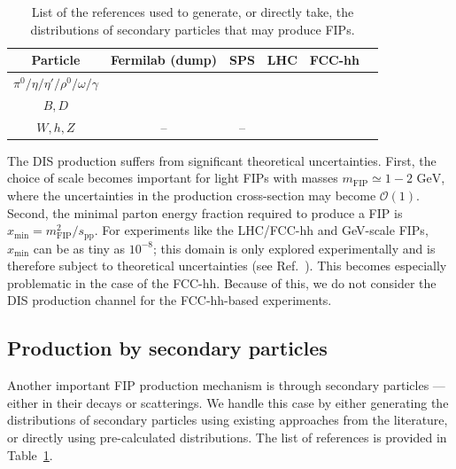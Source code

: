 \documentclass[
    aps,prd,
    twocolumn,
    nofootinbib,
    superscriptaddress,
]{revtex4}
\begin{document}
\begin{table}[!h]
    \centering
    \begin{tabular}{|c|c|c|c|c|c|}
       \hline Particle & Fermilab (dump) & SPS & LHC & FCC-hh \\ \hline
       $\pi^{0}/\eta/\eta'/\rho^{0}/\omega/\gamma$  & \cite{Dobrich:2019dxc} & \cite{Dobrich:2019dxc} & \cite{Pierog:2013ria} & \cite{Pierog:2013ria} \\ \hline
        $B,D$  & \cite{Jerhot:2022chi} & \cite{CERN-SHiP-NOTE-2015-009} & \cite{Kling:2021fwx} & \cite{Kling:2021fwx}  \\ \hline
         $W,h,Z$   & -- & -- & \cite{Kling:2021fwx} & \cite{Kling:2021fwx} \\ \hline
    \end{tabular}
    \caption{List of the references used to generate, or directly take, the distributions of secondary particles that may produce FIPs.}
    \label{tab:secondary-particles-spectra}
\end{table}

The DIS production suffers from significant theoretical uncertainties. First, the choice of scale becomes important for light FIPs with masses $m_{\text{FIP}}\simeq 1-2\text{ GeV}$, where the uncertainties in the production cross-section may become $\mathcal{O}(1)$. Second, the minimal parton energy fraction required to produce a FIP is $x_{\text{min}} = m_{\text{FIP}}^{2}/s_{\text{pp}}$. For experiments like the LHC/FCC-hh and GeV-scale FIPs, $x_{\text{min}}$ can be as tiny as $10^{-8}$; this domain is only explored experimentally and is therefore subject to theoretical uncertainties (see Ref.~\cite{Berlin:2018jbm}). This becomes especially problematic in the case of the FCC-hh. Because of this, we do not consider the DIS production channel for the FCC-hh-based experiments.  


\subsection{Production by secondary particles}
\label{app:secondary-particles-references}
Another important FIP production mechanism is through secondary particles --- either in their decays or scatterings. We handle this case by either generating the distributions of secondary particles using existing approaches from the literature, or directly using pre-calculated distributions. The list of references is provided in Table~\ref{tab:secondary-particles-spectra}.
\end{document}
